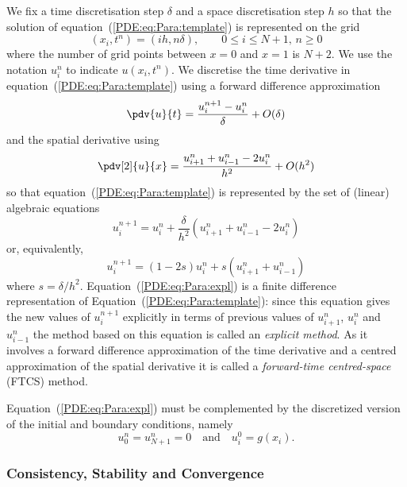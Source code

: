 We fix a time discretisation step $\delta$ and a space discretisation
step $h$ so that the solution of equation~(\ref{PDE:eq:Para:template})
is represented on the grid
%
\begin{equation*}
  (x_i,t^n) = (i h, n \delta), \qquad 0 \le i \le N + 1, \, n \ge 0
\end{equation*}
%
where the number of grid points between $x=0$ and $x=1$ is $N+2$.  We
use the notation $u_i^n$ to indicate $u(x_i,t^n)$.  We discretise the
time derivative in equation~(\ref{PDE:eq:Para:template}) using a
forward difference approximation
%
\begin{equation}
  \pdv{u}{t} = \frac{u_i^{n+1}-u_i^{n}}{\delta} + O(\delta)
  \label{PDE:eq:ut}
\end{equation}
%
and the spatial derivative using
%
\begin{equation}
  \pdv[2]{u}{x} = \frac{u_{i+1}^{n}+u_{i-1}^{n}-2u_{i}^{n}}{h^2} + O(h^2)
  \label{PDE:eq:uxx}
\end{equation}
%
so that equation~(\ref{PDE:eq:Para:template}) is represented by the
set of (linear) algebraic equations
%
\begin{equation*}
  u_{i}^{n+1} = u_{i}^{n} +
  \frac{\delta}{h^2} (u_{i+1}^{n}+u_{i-1}^{n}-2u_{i}^{n})
\end{equation*}
%
or, equivalently,
%
\begin{equation}
  u_{i}^{n+1} = (1-2s) u_{i}^{n} + s (u_{i+1}^{n}+u_{i-1}^{n})
  \label{PDE:eq:Para:expl}
\end{equation}
%
where $s = \delta/h^2$.  Equation~(\ref{PDE:eq:Para:expl}) is a finite
difference representation of Equation~(\ref{PDE:eq:Para:template}):
since this equation gives the new values of $u_{i}^{n+1}$ explicitly
in terms of previous values of $u_{i+1}^{n}$, $u_{i}^{n}$ and
$u_{i-1}^{n}$ the method based on this equation is called an
\textit{explicit method}.  As it involves a forward difference
approximation of the time derivative and a centred approximation of
the spatial derivative it is called a \textit{forward-time
  centred-space} (FTCS) method.

Equation~(\ref{PDE:eq:Para:expl}) must be complemented by the
discretized version of the initial and boundary conditions, namely
%
\begin{equation*}
  u_{0}^{n} = u_{N+1}^{n} = 0 \quad \mbox{and} \quad u_{i}^{0} = g(x_i) .
\end{equation*}

\subsubsection{Consistency, Stability and Convergence}

